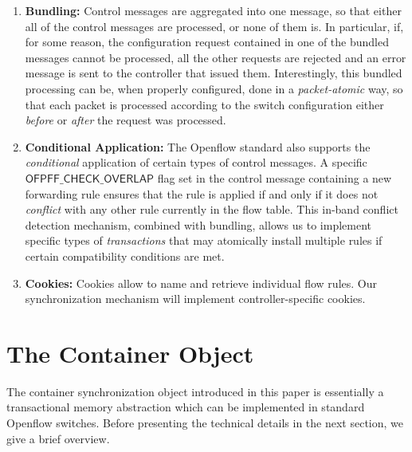 \documentclass[conference]{sigcomm-alternate}
\begin{document}
\begin{enumerate}
\item \textbf{Bundling:}
Control messages are aggregated into one message, so that either all of the control messages are
processed, or none of them is. In particular, if, for some reason, the
configuration request contained in one of the bundled messages cannot
be processed, all the other requests  are rejected and an error
message is sent to the controller that issued them.
Interestingly, this bundled processing can be, when properly configured, done in a
\emph{packet-atomic} way, so that each packet is processed according
to the switch configuration either \emph{before} or \emph{after} the
request was processed.

\item \textbf{Conditional Application:}
The Openflow standard also supports the \emph{conditional} application of
certain types of control messages. A specific $\textsf{OFPFF\_CHECK\_OVERLAP}$ flag
set in the control message containing a new forwarding rule ensures
that the rule is applied if and only if it does not \emph{conflict}
with any other rule currently in the flow table.
This in-band conflict detection mechanism, combined with bundling,
allows us to implement specific types of \emph{transactions} that may
atomically install multiple rules if certain compatibility conditions
are met.

\item \textbf{Cookies:} Cookies allow to name and retrieve individual
flow rules. Our synchronization mechanism will implement controller-specific cookies.
\end{enumerate}

\section{The Container Object}\label{sec:vision}

The container synchronization object introduced in this paper
is essentially a transactional memory abstraction which can be implemented
in standard Openflow switches.
Before presenting the technical details in the next section,
we give a brief overview.
\end{document}
